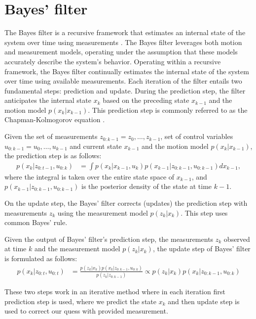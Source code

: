 \section{Bayes' filter}
The Bayes filter is a recursive framework that estimates an internal state of the system over time using measurements
. The Bayes filter leverages both motion and measurement models, operating under the assumption that these models
accurately describe the system's behavior. Operating within a recursive framework, the Bayes filter continually
estimates the internal state of the system over time using available measurements. Each iteration of the filter
entails two fundamental steps: prediction and update. During the prediction step, the filter anticipates the internal
state $x_k$ based on the preceding state $x_{k-1}$ and the motion model $p(x_k|x_{k-1})$. This prediction step is
commonly referred to as the Chapman-Kolmogorov equation \cite{DedeciusSeq2017}.
\begin{theorem}
    Given the set of measurements $z_{0:k-1} = {z_0,\dots, z_{k-1}}$, set of control variables $u_{0:k-1} = {u_0,\dots, u_{k-1}}$ and current state $x_{k-1}$ and the motion model $p(x_k|x_{k-1})$, the prediction step is as follows:
    \begin{align}
        p(x_k|z_{0:t-1}, u_{0:k}) &= \int p(x_k|x_{k-1}, u_k) p(x_{k-1}|z_{0:k-1}, u_{0:k-1}) dx_{k-1},
        \label{eq:chapman_kolmogorov_predict}
    \end{align}
    where the integral is taken over the entire state space of $x_{k-1}$, and $p(x_{k-1}|z_{0:k-1}, u_{0:k-1})$ is
    the posterior density of the state at time $k-1$.
\end{theorem}
On the update step, the Bayes' filter corrects (updates) the prediction step with measurements $z_k$ using the
measurement model $p(z_k|x_k)$. This step uses common Bayes' rule.
\begin{theorem}
    Given the output of Bayes' filter's prediction step, the measurements $z_k$ observed at time $k$ and the
    measurement model $p(z_k|x_k)$, the update step of Bayes' filter is formulated as follows:
    \begin{align}
        \label{eq:bayes_update}
        p(x_k|z_{0:t}, u_{0:t}) &= \frac{p(z_k|x_k) p(x_k|z_{0:k-1},u_{0:k})}{p(z_k|z_{0:k-1})} \propto p(z_k|x_k) p
        (x_k|z_{0:k-1},u_{0:k})
    \end{align}
\end{theorem}
These two steps work in an iterative method where in each iteration first prediction step is used, where we predict
the state $x_k$ and then update step is used to correct our quess with provided measurement.
